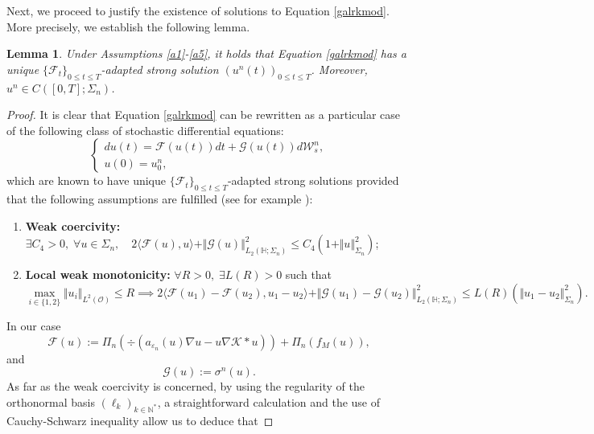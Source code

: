\documentclass[10pt,number,preprint,times]{elsarticle}
\numberwithin{equation}{section} %
\newtheorem{lem}{Lemma}[section]
\begin{document}
\noindent
Next, we proceed to justify the existence of solutions to Equation \eqref{galrkmod}. More precisely, we establish the following lemma.
\begin{lem}\label{éxisfaédo}
Under Assumptions \ref{a1}-\ref{a5}, it holds that Equation \eqref{galrkmod} has a unique $\{\mathcal{F}_t\}_{0 \leq t \leq T}$-adapted strong solution $\left(u^n(t)\right)_{0 \leq t \leq T}$. Moreover, $u^n \in C([0,T];\Sigma_n)$.
\end{lem}
\begin{proof}
It is clear that Equation \eqref{galrkmod} can be rewritten as a particular case of  the following class of stochastic differential equations:
\begin{equation}
	\begin{cases}
	du(t)=\mathscr{F}(u(t))dt+\mathscr{G}(u(t))d\mathcal{W}^n_s,\\
	u(0)=u^n_0,
	\end{cases}
\end{equation}
which are known to have unique $\{\mathcal{F}_t\}_{0 \leq t \leq T}$-adapted strong solutions provided that the following assumptions are fulfilled (see for example \cite[Theorem 1.2]{krylov1999kolmogorov}): 
\begin{enumerate}
	\item \textbf{Weak coercivity:} $\exists C_4>0, \; \forall u \in \Sigma_n,\quad
	 2 \langle \mathscr{F}(u),u\rangle+ \Vert \mathscr{G}(u) \Vert_{L_2(\mathbb{H};\Sigma_n)}^2 \leq C_4 \left(1+\Vert u \Vert_{\Sigma_n}^2\right)$;
	 \item \textbf{Local weak monotonicity:}  $\forall R>0,\; \exists L(R)>0$ such that $$
	 \underset{i \in \{1,2\}}{\max} \Vert u_i \Vert_{L^2(\mathcal{O})} \leq R \implies 2 \langle \mathscr{F}(u_1)-\mathscr{F}(u_2),u_1-u_2\rangle+ \Vert \mathscr{G}(u_1)-\mathscr{G}(u_2) \Vert_{L_2(\mathbb{H};\Sigma_n)}^2 \leq L(R) \left(\Vert u_1-u_2 \Vert_{\Sigma_n}^2\right).$$
\end{enumerate}
In our case 
$$
\mathscr{F}(u):=\Pi_n\left(\div\left(a_{\varepsilon_n}(u) \nabla u-u\nabla \mathcal{K} \ast u\right)\right)+\Pi_n\left( f_M(u)\right),
$$
and 
$$
\mathscr{G}(u):=\sigma^n(u).
$$
As far as the weak coercivity is concerned, by using the regularity of the orthonormal basis $\left(\ell_k\right)_{k \in \mathbb{N}^*}$, a straightforward calculation and the use of Cauchy-Schwarz inequality allow us to deduce that

\end{proof}
\end{document}
